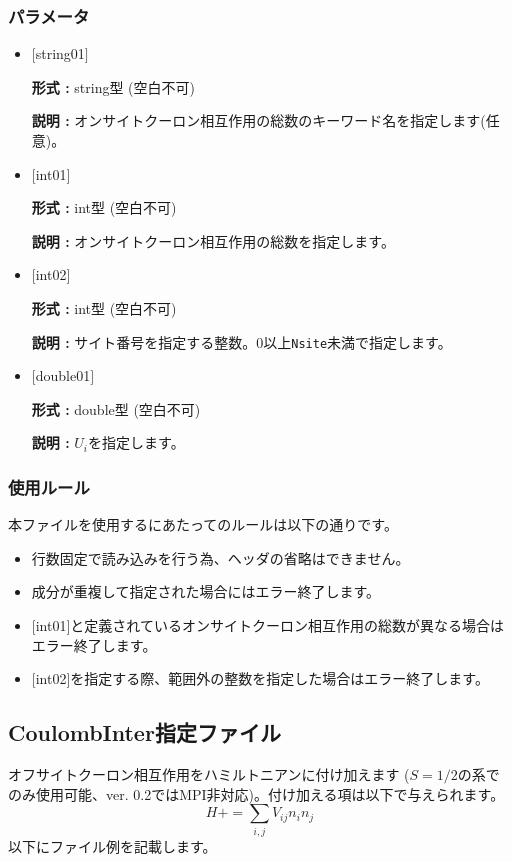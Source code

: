 \subsubsection{パラメータ}
 \begin{itemize}

   \item  $[$string01$]$
   
    {\bf 形式 :} string型 (空白不可)

   {\bf 説明 :} オンサイトクーロン相互作用の総数のキーワード名を指定します(任意)。

   \item  $[$int01$]$
   
    {\bf 形式 :} int型 (空白不可)

   {\bf 説明 :} オンサイトクーロン相互作用の総数を指定します。

  \item  $[$int02$]$
  
 {\bf 形式 :} int型 (空白不可)

{\bf 説明 :} サイト番号を指定する整数。0以上\verb|Nsite|{未満}で指定します。
 
 \item  $[$double01$]$
   
   {\bf 形式 :} double型 (空白不可)

  {\bf 説明 :}  $U_i$を指定します。
  
\end{itemize}

\subsubsection{使用ルール}
本ファイルを使用するにあたってのルールは以下の通りです。
\begin{itemize}
\item 行数固定で読み込みを行う為、ヘッダの省略はできません。
\item 成分が重複して指定された場合にはエラー終了します。
\item $[$int01$]$と定義されているオンサイトクーロン相互作用の総数が異なる場合はエラー終了します。
\item $[$int02$]$を指定する際、範囲外の整数を指定した場合はエラー終了します。
\end{itemize}


\newpage
\subsection{CoulombInter指定ファイル}
オフサイトクーロン相互作用をハミルトニアンに付け加えます{ ($S=1/2$の系でのみ使用可能、ver. 0.2ではMPI非対応)}。付け加える項は以下で与えられます。
\begin{equation}
H+=\sum_{i,j}V_{ij} n_ {i}n_{j}
\end{equation}
以下にファイル例を記載します。

